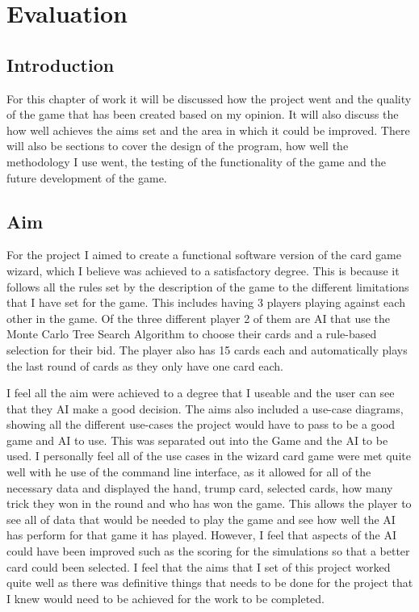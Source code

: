 \chapter{Evaluation}
\section{Introduction}
For this chapter of work it will be discussed how the project went and the quality of the game that has been created based on my opinion. It will also discuss the how well achieves the aims set and the area in which it could be improved. There will also be sections to cover the design of the program, how well the methodology I use went, the testing of the functionality of the game and the future development of the game.
\section{Aim}
For the project I aimed to create a functional software version of the card game wizard, which I believe was achieved to a satisfactory degree. This is because it follows all the rules set by the description of the game to the different limitations that I have set for the game. This includes having 3 players playing against each other in the game. Of the three different player 2 of them are AI that use the Monte Carlo Tree Search Algorithm to choose their cards and a rule-based selection for their bid. The player also has 15 cards each and automatically plays the last round of cards as they only have one card each. 

I feel all the aim were achieved to a degree that I useable and the user can see that they AI make a good decision. The aims also included a use-case diagrams, showing all the different use-cases the project would have to pass to be a good game and AI to use. This was separated out into the Game and the AI to be used. I personally feel all of the use cases in the wizard card game were met quite well with he use of the command line interface, as it allowed for all of the necessary data and displayed the hand, trump card, selected cards, how many trick they won in the round and who has won the game. This allows the player to see all of data that would be needed to play the game and see how well the AI has perform for that game it has played. However, I feel that aspects of the AI could have been improved such as the scoring for the simulations so that a better card could been selected. I feel that the aims that I set of this project worked quite well as there was definitive things that needs to be done for the project that I knew would need to be achieved for the work to be completed.
